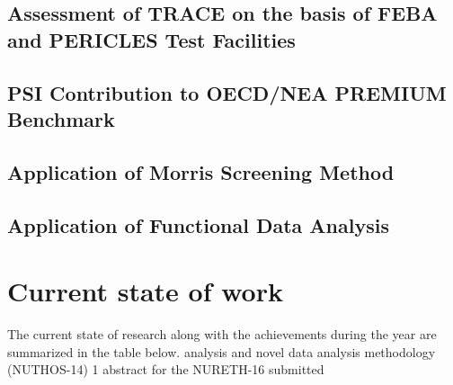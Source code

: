 \documentclass[11pt,titlepage]{article}
\begin{document}
\subsection{Assessment of TRACE on the basis of FEBA and PERICLES Test Facilities}

\subsection{PSI Contribution to OECD/NEA PREMIUM Benchmark}

\subsection{Application of Morris Screening Method}

\subsection{Application of Functional Data Analysis}

\section{Current state of work}

The current state of research along with the achievements during the year are 
summarized in the table below.
                   analysis and
                               novel data analysis methodology (NUTHOS-14)
                          1 abstract for the NURETH-16 submitted 
                                             
\end{document}
